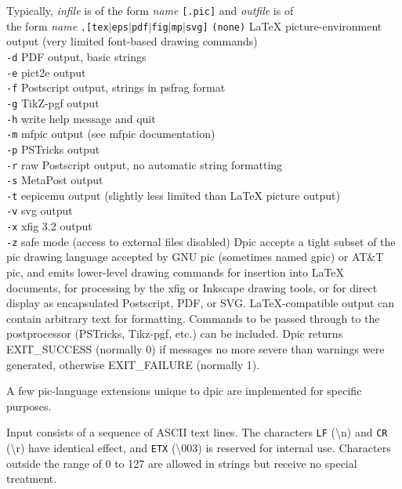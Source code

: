 Typically,
{\it infile}
is of the form
{\it name}
{\tt [.pic]}
and
{\it outfile}
is of
\\\hbox{}\hskip-1pt
the form
{\it name}
{\tt .[tex$|$eps$|$pdf$|$fig$|$mp$|$svg]}
{\tt (none)}
LaTeX picture-environment output (very limited font-based drawing commands)
\\\hbox{}\hskip-1pt
{\tt -d}
PDF output, basic strings
\\\hbox{}\hskip-1pt
{\tt -e}
pict2e output
\\\hbox{}\hskip-1pt
{\tt -f}
Postscript output, strings in psfrag format
\\\hbox{}\hskip-1pt
{\tt -g}
TikZ-pgf output
\\\hbox{}\hskip-1pt
{\tt -h}
write help message and quit
\\\hbox{}\hskip-1pt
{\tt -m}
mfpic output (see mfpic documentation)
\\\hbox{}\hskip-1pt
{\tt -p}
PSTricks output
\\\hbox{}\hskip-1pt
{\tt -r}
raw Postscript output, no automatic string formatting
\\\hbox{}\hskip-1pt
{\tt -s}
MetaPost output
\\\hbox{}\hskip-1pt
{\tt -t}
eepicemu output (slightly less limited than LaTeX picture output)
\\\hbox{}\hskip-1pt
{\tt -v}
svg output
\\\hbox{}\hskip-1pt
{\tt -x}
xfig 3.2 output
\\\hbox{}\hskip-1pt
{\tt -z}
safe mode (access to external files disabled)
%
Dpic accepts a tight subset of the pic drawing language accepted by
GNU pic (sometimes named gpic) or AT\&T pic, and emits lower-level
drawing commands for insertion into LaTeX documents, for processing by
the xfig or Inkscape drawing tools, or for direct display as encapsulated
Postscript, PDF, or SVG. LaTeX-compatible output can contain arbitrary
text for formatting.  Commands to be passed through to the postprocessor
(PSTricks, Tikz-pgf, etc.)  can be included.  Dpic returns EXIT\_SUCCESS
(normally 0) if messages no more severe than warnings were generated,
otherwise EXIT\_FAILURE (normally 1).

A few pic-language extensions unique to dpic
are implemented for specific purposes.

Input consists of a sequence of ASCII text lines.
The characters
{\tt LF}
(\textbackslash n) and
{\tt CR}
(\textbackslash r) have identical effect,
and
{\tt ETX}
(\textbackslash 003) is reserved for internal use.
Characters outside the range of 0 to 127 are allowed in strings but
receive no special treatment.

